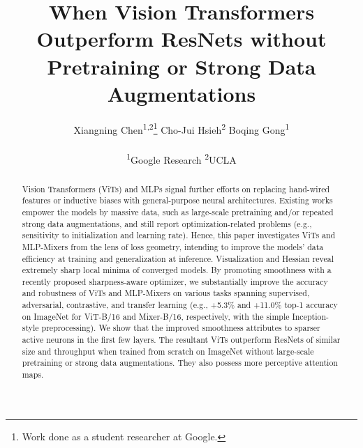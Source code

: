 \documentclass{article}
\title{When Vision Transformers Outperform ResNets without Pretraining or Strong Data Augmentations}
\author{%
   Xiangning Chen\textsuperscript{1,2}\thanks{Work done as a student researcher at Google.}
   \enskip\enskip\enskip\enskip\enskip\enskip\enskip
   Cho-Jui Hsieh\textsuperscript{2}
   \enskip\enskip\enskip\enskip\enskip\enskip\enskip
   Boqing Gong\textsuperscript{1}\\
   \\
   \textsuperscript{1}Google Research \enskip\enskip\enskip\enskip\enskip \textsuperscript{2}UCLA\\
}
\begin{document}
\maketitle

\begin{abstract}


Vision Transformers (ViTs) and MLPs signal further efforts on replacing hand-wired features or inductive biases with general-purpose neural architectures. Existing works empower the models by massive data, such as large-scale pretraining and/or repeated strong data augmentations, and still report optimization-related problems (e.g., sensitivity to initialization and learning rate). Hence, this paper investigates ViTs and MLP-Mixers from the lens of loss geometry, intending to improve the models' data efficiency at training and generalization at inference. Visualization and Hessian reveal extremely sharp local minima of converged models. By promoting smoothness with a recently proposed sharpness-aware optimizer, we substantially improve the accuracy and robustness of ViTs and MLP-Mixers on various tasks spanning supervised, adversarial, contrastive, and transfer learning (e.g., +5.3\% and +11.0\% top-1 accuracy on ImageNet for ViT-B/16 and Mixer-B/16, respectively, with the simple Inception-style preprocessing). We show that the improved smoothness attributes to sparser active neurons in the first few layers. The resultant ViTs outperform ResNets of similar size and throughput when trained from scratch on ImageNet without large-scale pretraining or strong data augmentations. They also possess more perceptive attention maps. 


\end{abstract}
\end{document}
